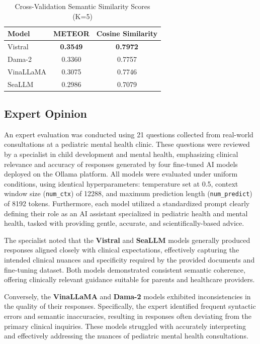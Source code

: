 \documentclass[conference]{IEEEtran}
\begin{document}
\begin{table}[H]
\centering
\caption{Cross-Validation Semantic Similarity Scores (K=5)}
\label{tab:cv-semantic}
\begin{tabular}{|l|c|c|}
\hline
\textbf{Model} & \textbf{METEOR} & \textbf{Cosine Similarity} \\
\hline
Vistral    & \textbf{0.3549} & \textbf{0.7972} \\
Dama-2     & 0.3360 & 0.7757 \\
VinaLLaMA  & 0.3075 & 0.7746 \\
SeaLLM     & 0.2986 & 0.7079 \\
\hline
\end{tabular}
\end{table}

\subsection{Expert Opinion}

An expert evaluation was conducted using 21 questions collected from real-world consultations at a pediatric mental health clinic. These questions were reviewed by a specialist in child development and mental health, emphasizing clinical relevance and accuracy of responses generated by four fine-tuned AI models deployed on the Ollama platform. All models were evaluated under uniform conditions, using identical hyperparameters: temperature set at 0.5, context window size (\texttt{num\_ctx}) of 12288, and maximum prediction length (\texttt{num\_predict}) of 8192 tokens. Furthermore, each model utilized a standardized prompt clearly defining their role as an AI assistant specialized in pediatric health and mental health, tasked with providing gentle, accurate, and scientifically-based advice.

The specialist noted that the \textbf{Vistral} and \textbf{SeaLLM} models generally produced responses aligned closely with clinical expectations, effectively capturing the intended clinical nuances and specificity required by the provided documents and fine-tuning dataset. Both models demonstrated consistent semantic coherence, offering clinically relevant guidance suitable for parents and healthcare providers.

Conversely, the \textbf{VinaLLaMA} and \textbf{Dama-2} models exhibited inconsistencies in the quality of their responses. Specifically, the expert identified frequent syntactic errors and semantic inaccuracies, resulting in responses often deviating from the primary clinical inquiries. These models struggled with accurately interpreting and effectively addressing the nuances of pediatric mental health consultations.
\end{document}
